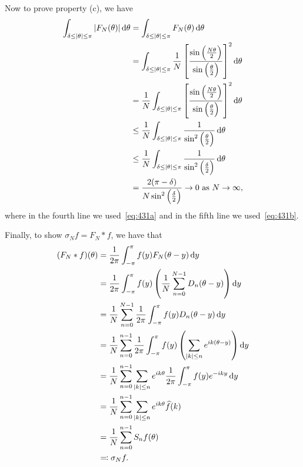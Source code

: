 \documentclass{article}
\begin{document}
Now to prove property (c), we have
%
\begin{align*}
    \int_{\delta \leq |\theta| \leq \pi} |F_N(\theta)| \dif \theta
        &= \int_{\delta \leq |\theta| \leq \pi} F_N(\theta) \dif \theta \\
        &= \int_{\delta \leq |\theta| \leq \pi}
            \frac{1}{N} \sbr{\frac{\sin \del{\frac{N \theta}{2}}}{\sin \del{\frac{\theta}{2}}}}^2
            \dif \theta \\
        &= \frac{1}{N} \int_{\delta \leq |\theta| \leq \pi}
            \sbr{\frac{\sin \del{\frac{N \theta}{2}}}{\sin \del{\frac{\theta}{2}}}}^2
            \dif \theta \\
        &\leq \frac{1}{N} \int_{\delta \leq |\theta| \leq \pi}
            \frac{1}{\sin^2 \del{\frac{\theta}{2}}}
            \dif \theta \\
        &\leq \frac{1}{N} \int_{\delta \leq |\theta| \leq \pi}
            \frac{1}{\sin^2 \del{\frac{\delta}{2}}}
            \dif \theta \\
        &= \frac{2 (\pi - \delta)}{N \sin^2 \del{\frac{\delta}{2}}}
        \to 0 \text{ as } N \to \infty
    ,
\end{align*}
%
where in the fourth line we used~\eqref{eq:431a} and in the fifth line
we used~\eqref{eq:431b}.

Finally, to show $\sigma_N f = F_N * f$, we have that
%
\begin{align*}
    (F_N * f) (\theta)
        &= \frac{1}{2 \pi} \int_{- \pi}^\pi f(y) F_N(\theta - y) \dif y \\
        &= \frac{1}{2 \pi} \int_{- \pi}^\pi f(y) \del{\frac{1}{N} \sum_{n = 0}^{N - 1} D_n (\theta - y)} \dif y \\
        &= \frac{1}{N} \sum_{n = 0}^{N - 1} \frac{1}{2 \pi} \int_{- \pi}^\pi f(y) D_n (\theta - y) \dif y \\
        &= \frac{1}{N} \sum_{n = 0}^{n - 1} \frac{1}{2 \pi} \int_{- \pi}^\pi f(y) \del{\sum_{|k| \leq n} e^{i k (\theta - y)}} \dif y \\
        &= \frac{1}{N} \sum_{n = 0}^{n - 1} \sum_{|k| \leq n} e^{i k \theta} \frac{1}{2 \pi} \int_{- \pi}^\pi f(y) e^{- i k y} \dif y \\
        &= \frac{1}{N} \sum_{n = 0}^{n - 1} \sum_{|k| \leq n} e^{i k \theta} \widehat{f}(k)  \\
        &= \frac{1}{N} \sum_{n = 0}^{n - 1} S_n f(\theta) \\
        &\eqqcolon \sigma_N f
        .
\end{align*}
\end{document}

